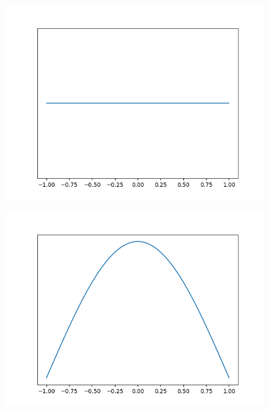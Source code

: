 \begin{figure}[!h]
    \centering
    \includegraphics[scale=0.5]
    {./content/figures/dists/uniform}
    \caption{}
    \label{fig:uniform}
\end{figure}

\begin{figure}[!h]
    \centering
    \includegraphics[scale=0.5]
    {./content/figures/dists/gaussian}
    \caption{}
    \label{fig:gaussian}
\end{figure}

